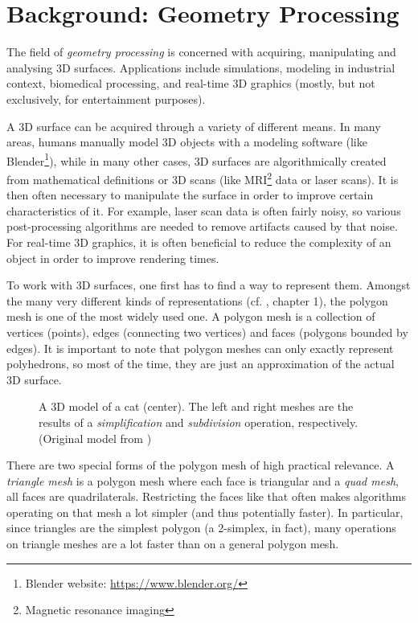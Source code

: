 \chapter{Background: Geometry Processing}

The field of \emph{geometry processing} is concerned with acquiring, manipulating and analysing 3D surfaces.
Applications include simulations, modeling in industrial context, biomedical processing, and real-time 3D graphics (mostly, but not exclusively, for entertainment purposes).

A 3D surface can be acquired through a variety of different means.
In many areas, humans manually model 3D objects with a modeling software (like Blender\footnote{Blender website: \url{https://www.blender.org/}}), while in many other cases, 3D surfaces are algorithmically created from mathematical definitions or 3D scans (like MRI\footnote{Magnetic resonance imaging} data or laser scans).
It is then often necessary to manipulate the surface in order to improve certain characteristics of it.
For example, laser scan data is often fairly noisy, so various post-processing algorithms are needed to remove artifacts caused by that noise.
For real-time 3D graphics, it is often beneficial to reduce the complexity of an object in order to improve rendering times.

To work with 3D surfaces, one first has to find a way to represent them.
Amongst the many very different kinds of representations (cf. \cite{botsch2010polygon}, chapter 1), the polygon mesh is one of the most widely used one.
A polygon mesh is a collection of vertices (points), edges (connecting two vertices) and faces (polygons bounded by edges).
It is important to note that polygon meshes can only exactly represent polyhedrons, so most of the time, they are just an approximation of the actual 3D surface.

\begin{figure}[b]
  
  \caption{A 3D model of a cat (center). The left and right meshes are the results of a \emph{simplification} and \emph{subdivision} operation, respectively. (Original model from \cite{catmodel})}
\end{figure}

There are two special forms of the polygon mesh of high practical relevance. A \emph{triangle mesh} is a polygon mesh where each face is triangular and a \emph{quad mesh}, all faces are quadrilaterals.
Restricting the faces like that often makes algorithms operating on that mesh a lot simpler (and thus potentially faster).
In particular, since triangles are the simplest polygon (a 2-simplex, in fact), many operations on triangle meshes are a lot faster than on a general polygon mesh.


